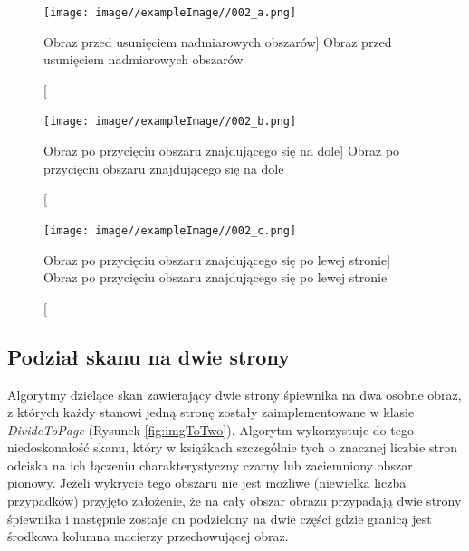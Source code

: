 \documentclass[a4paper,12pt]{article}
\newcommand\spacingIndent{2.2em}
\begin{document}
			    
			
    		    \begin{figure}[!ht]  
    			    \begin{center}
    				    \texttt{[image: image//exampleImage//002\_a.png]} 
    			    \end{center}
    			    \caption
    			        [Obraz przed usunięciem nadmiarowych obszarów]
        			    {Obraz przed usunięciem nadmiarowych obszarów}  
    		    \end{figure}
    		    
    		    \begin{figure}[!ht]  
    			    \begin{center}
    				    \texttt{[image: image//exampleImage//002\_b.png]} 
    			    \end{center}
    			    \caption
            			[Obraz po przycięciu obszaru znajdującego się na dole] 
        			    {Obraz po przycięciu obszaru znajdującego się na dole}  
    		    \end{figure}
    			
    	        \begin{figure}[!ht]  
    			    \begin{center}
    				    \texttt{[image: image//exampleImage//002\_c.png]}
    			    \end{center}
        			\caption
        			    [Obraz po przycięciu obszaru znajdującego się po lewej stronie]
        			    {Obraz po przycięciu obszaru znajdującego się po lewej stronie} 
    		    \end{figure}

		\subsection{Podział skanu na dwie strony}
		    \hspace{\spacingIndent} Algorytmy dzielące skan zawierający dwie strony śpiewnika na dwa osobne obraz, z których każdy stanowi jedną stronę
		    zostały zaimplementowane w klasie \textit{DivideToPage} (Rysunek \ref{fig:imgToTwo}). Algorytm wykorzystuje do tego niedoskonałość          skanu, który w książkach szczególnie tych o znacznej liczbie stron          odciska na ich łączeniu charakterystyczny czarny lub zaciemniony          obszar pionowy. Jeżeli wykrycie tego obszaru nie jest możliwe (niewielka    liczba przypadków) przyjęto założenie, że na cały obszar obrazu przypadają dwie strony śpiewnika i następnie zostaje on podzielony na dwie części gdzie granicą jest środkowa kolumna macierzy przechowującej obraz.    
		    
\end{document}

